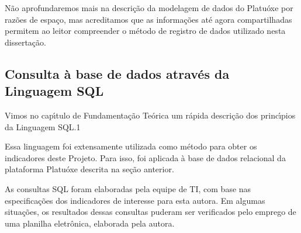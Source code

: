 \documentclass[
12pt,		%
openright,	%
twoside,  %
a4paper,			%
chapter=TITLE,		%
english,			%
french,				%
spanish,			%
brazil				%
]{USPSC-classe/USPSC}
\begin{document}
N\~ao aprofundaremos mais na descri\c{c}\~ao da modelagem de dados do Platu\'oxe por raz\~oes de espa\c{c}o, mas acreditamos que as informa\c{c}\~oes at\'e agora compartilhadas permitem ao leitor compreender o m\'etodo de registro de dados utilizado nesta disserta\c{c}\~ao.

















\subsection[Consulta \`a base de dados atrav\'es da Linguagem SQL]{Consulta \`a base de dados atrav\'es da Linguagem SQL}\label{Consulta \`a base de dados atrav\'es da Linguagem SQL}
Vimos no cap\'{\i}tulo de Fundamenta\c{c}\~ao Te\'orica um r\'apida descri\c{c}\~ao dos princ\'{\i}pios da Linguagem SQL.1

















Essa linguagem foi extensamente utilizada como m\'etodo para obter os indicadores deste Projeto. Para isso, foi aplicada \`a base de dados relacional da plataforma Platu\'oxe descrita na se\c{c}\~ao anterior.

















As consultas SQL foram elaboradas pela equipe de TI, com base nas especifica\c{c}\~oes dos indicadores de interesse para esta autora. Em algumas situa\c{c}\~oes, os resultados dessas consultas puderam ser verificados pelo emprego de uma planilha eletr\^onica, elaborada pela autora.
\end{document}
